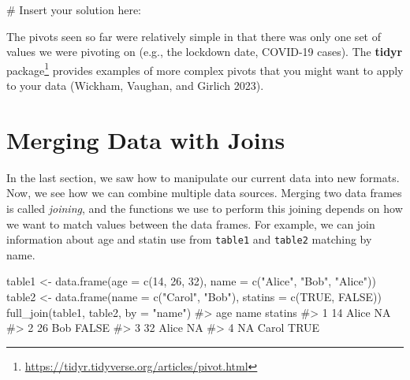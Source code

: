 \documentclass[
  letterpaper,
]{latex/krantz}
\makeatletter
\newenvironment{Shaded}{\begin{snugshade}}{\end{snugshade}}
\newcommand{\AttributeTok}[1]{\textcolor[rgb]{0.40,0.45,0.13}{#1}}
\newcommand{\CommentTok}[1]{\textcolor[rgb]{0.37,0.37,0.37}{#1}}
\newcommand{\ConstantTok}[1]{\textcolor[rgb]{0.56,0.35,0.01}{#1}}
\newcommand{\DecValTok}[1]{\textcolor[rgb]{0.68,0.00,0.00}{#1}}
\newcommand{\FunctionTok}[1]{\textcolor[rgb]{0.28,0.35,0.67}{#1}}
\newcommand{\NormalTok}[1]{\textcolor[rgb]{0.00,0.23,0.31}{#1}}
\newcommand{\OtherTok}[1]{\textcolor[rgb]{0.00,0.23,0.31}{#1}}
\newcommand{\StringTok}[1]{\textcolor[rgb]{0.13,0.47,0.30}{#1}}
\renewcommand{\href}[2]{#2\footnote{\url{#1}}}
\newenvironment{kframe}{%
\medskip{}
\setlength{\fboxsep}{.8em}
 \def\at@end@of@kframe{}%
 \ifinner\ifhmode%
  \def\at@end@of@kframe{\end{minipage}}%
  \begin{minipage}{\columnwidth}%
 \fi\fi%
 \def\FrameCommand##1{\hskip\@totalleftmargin \hskip-\fboxsep
 \colorbox{shadecolor}{##1}\hskip-\fboxsep
     \hskip-\linewidth \hskip-\@totalleftmargin \hskip\columnwidth}%
 \MakeFramed {\advance\hsize-\width
   \@totalleftmargin\z@ \linewidth\hsize
   \@setminipage}}%
 {\par\unskip\endMakeFramed%
 \at@end@of@kframe}
\renewenvironment{Shaded}{\begin{kframe}}{\end{kframe}}
\makeatother
\begin{document}
\begin{Shaded}
\begin{Highlighting}[]
\CommentTok{\# Insert your solution here:}
\end{Highlighting}
\end{Shaded}

The pivots seen so far were relatively simple in that there was only one
set of values we were pivoting on (e.g., the lockdown date, COVID-19
cases). The
\href{https://tidyr.tidyverse.org/articles/pivot.html}{\textbf{tidyr}
package} provides examples of more complex pivots that you might want to
apply to your data (Wickham, Vaughan, and Girlich
2023).

\section{\texorpdfstring{Merging Data with Joins 
}{Merging Data with Joins  }}\label{merging-data-with-joins}

In the last section, we saw how to manipulate our current data into new
formats. Now, we see how we can combine multiple data sources. Merging
two data frames is called \emph{joining}, and the functions we use to
perform this joining depends on how we want to match values between the
data frames. For example, we can join information about age and statin
use from \texttt{table1} and \texttt{table2} matching by name.

\begin{Shaded}
\begin{Highlighting}[]
\NormalTok{table1 }\OtherTok{\textless{}{-}} \FunctionTok{data.frame}\NormalTok{(}\AttributeTok{age =} \FunctionTok{c}\NormalTok{(}\DecValTok{14}\NormalTok{, }\DecValTok{26}\NormalTok{, }\DecValTok{32}\NormalTok{), }
                     \AttributeTok{name =} \FunctionTok{c}\NormalTok{(}\StringTok{"Alice"}\NormalTok{, }\StringTok{"Bob"}\NormalTok{, }\StringTok{"Alice"}\NormalTok{))}
\NormalTok{table2 }\OtherTok{\textless{}{-}} \FunctionTok{data.frame}\NormalTok{(}\AttributeTok{name =} \FunctionTok{c}\NormalTok{(}\StringTok{"Carol"}\NormalTok{, }\StringTok{"Bob"}\NormalTok{), }
                     \AttributeTok{statins =} \FunctionTok{c}\NormalTok{(}\ConstantTok{TRUE}\NormalTok{, }\ConstantTok{FALSE}\NormalTok{))}
\FunctionTok{full\_join}\NormalTok{(table1, table2, }\AttributeTok{by =} \StringTok{"name"}\NormalTok{)}
\CommentTok{\#\textgreater{}   age  name statins}
\CommentTok{\#\textgreater{} 1  14 Alice      NA}
\CommentTok{\#\textgreater{} 2  26   Bob   FALSE}
\CommentTok{\#\textgreater{} 3  32 Alice      NA}
\CommentTok{\#\textgreater{} 4  NA Carol    TRUE}
\end{Highlighting}
\end{Shaded}
\end{document}
